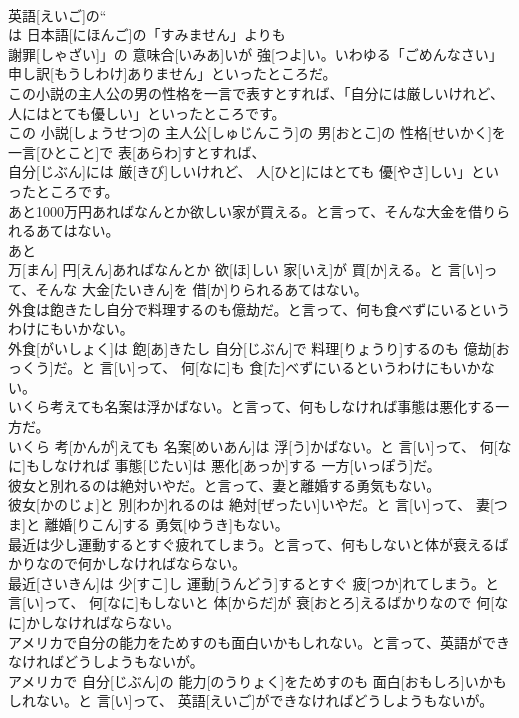 \documentclass[8pt]{extreport}
\begin{document}
\begin{CJK}{UTF8}{min}
\\	英語[えいご]の“ 
\\	は 日本語[にほんご]の「すみません」よりも
\\	謝罪[しゃざい]」の 意味合[いみあ]いが 強[つよ]い。いわゆる「ごめんなさい」
\\	申し訳[もうしわけ]ありません」といったところだ。
\\	この小説の主人公の男の性格を一言で表すとすれば、「自分には厳しいけれど、人にはとても優しい」といったところです。	
\\	この 小説[しょうせつ]の 主人公[しゅじんこう]の 男[おとこ]の 性格[せいかく]を 一言[ひとこと]で 表[あらわ]すとすれば、
\\	自分[じぶん]には 厳[きび]しいけれど、 人[ひと]にはとても 優[やさ]しい」といったところです。
\\	あと1000万円あればなんとか欲しい家が買える。と言って、そんな大金を借りられるあてはない。	
\\	あと 
\\	万[まん] 円[えん]あればなんとか 欲[ほ]しい 家[いえ]が 買[か]える。と 言[い]って、そんな 大金[たいきん]を 借[か]りられるあてはない。
\\	外食は飽きたし自分で料理するのも億劫だ。と言って、何も食べずにいるというわけにもいかない。	
\\	外食[がいしょく]は 飽[あ]きたし 自分[じぶん]で 料理[りょうり]するのも 億劫[おっくう]だ。と 言[い]って、 何[なに]も 食[た]べずにいるというわけにもいかない。
\\	いくら考えても名案は浮かばない。と言って、何もしなければ事態は悪化する一方だ。	
\\	いくら 考[かんが]えても 名案[めいあん]は 浮[う]かばない。と 言[い]って、 何[なに]もしなければ 事態[じたい]は 悪化[あっか]する 一方[いっぽう]だ。
\\	彼女と別れるのは絶対いやだ。と言って、妻と離婚する勇気もない。	
\\	彼女[かのじょ]と 別[わか]れるのは 絶対[ぜったい]いやだ。と 言[い]って、 妻[つま]と 離婚[りこん]する 勇気[ゆうき]もない。
\\	最近は少し運動するとすぐ疲れてしまう。と言って、何もしないと体が衰えるばかりなので何かしなければならない。	
\\	最近[さいきん]は 少[すこ]し 運動[うんどう]するとすぐ 疲[つか]れてしまう。と 言[い]って、 何[なに]もしないと 体[からだ]が 衰[おとろ]えるばかりなので 何[なに]かしなければならない。
\\	アメリカで自分の能力をためすのも面白いかもしれない。と言って、英語ができなければどうしようもないが。	
\\	アメリカで 自分[じぶん]の 能力[のうりょく]をためすのも 面白[おもしろ]いかもしれない。と 言[い]って、 英語[えいご]ができなければどうしようもないが。

\end{CJK}
\end{document}
